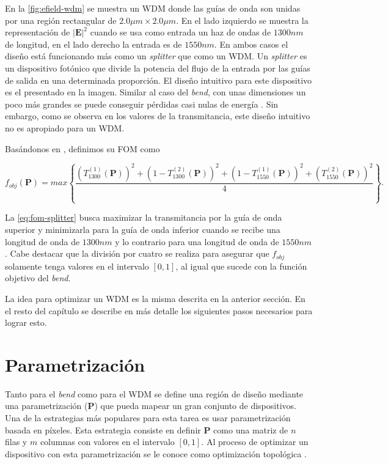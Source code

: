 En la \autoref{fig:efield-wdm} se muestra un WDM donde las guías de onda son unidas por una región rectangular
de $2.0\mu m \times 2.0 \mu m$. En el lado izquierdo se muestra la representación de $|\boldsymbol{E}|^2$ cuando se usa 
como entrada un haz de ondas de $1300 nm$ de longitud, en el lado derecho la entrada es de $1550 nm$.
En ambos casos el diseño está funcionando más como un \emph{splitter} que como un WDM.
Un \emph{splitter} es un dispositivo fotónico que divide la potencia del flujo de la entrada por las guías
de salida en una determinada proporción. El diseño intuitivo para este dispositivo es el presentado en la imagen. Similar al caso del
\emph{bend}, con unas dimensiones un poco más grandes se puede conseguir pérdidas casi nulas de energía
\citep{LukasChrostowski2010}.
Sin embargo, como se observa en los valores de la transmitancia, este diseño intuitivo no es apropiado para un WDM.

Basándonos en \cite{Su2020}, definimos su FOM como

\begin{equation}
  f_{obj}(\boldsymbol{P}) = max \left \{ \frac{\left ( T_{1300}^{(1)}(\boldsymbol{P}) \right )^2  + 
                            \left ( 1 - T_{1300}^{(2)}(\boldsymbol{P}) \right )^2 +
                            \left ( 1 - T_{1550}^{(1)}(\boldsymbol{P}) \right )^2  + 
                            \left ( T_{1550}^{(2)}(\boldsymbol{P}) \right )^2 }{4}
                    \right \}.
\label{eq:fom-splitter}
\end{equation}

La \autoref{eq:fom-splitter} busca maximizar la transmitancia por la guía de onda superior y minimizarla para
la guía de onda inferior cuando se recibe una longitud de onda de $1300 nm$ y lo contrario para una longitud
de onda de $1550 nm$. Cabe destacar que la división por cuatro se realiza para asegurar que $f_{obj}$ solamente
tenga valores en el intervalo $[0, 1]$, al igual que sucede con la función objetivo del \emph{bend}.

La idea para optimizar un WDM es la misma descrita en la anterior sección. 
En el resto del capítulo se describe en más detalle los siguientes pasos necesarios para lograr esto.

\section{Parametrización}\label{sec:parametrization}

Tanto para el \emph{bend} como para el WDM se define una región de diseño
mediante una parametrización ($\boldsymbol{P}$) que pueda mapear un gran conjunto de dispositivos.
Una de la estrategias más populares para esta tarea es usar parametrización
basada en píxeles. Esta estrategia consiste en definir $\boldsymbol{P}$ como una matriz 
de $n$ filas y $m$ columnas con valores en el intervalo $[0, 1]$.
Al proceso de optimizar un dispositivo con esta parametrización se le conoce como optimización
topológica \citep{Molesky2018}.

